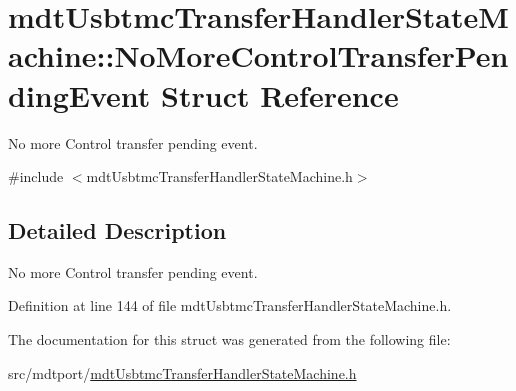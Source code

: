 \hypertarget{structmdt_usbtmc_transfer_handler_state_machine_1_1_no_more_control_transfer_pending_event}{\section{mdt\-Usbtmc\-Transfer\-Handler\-State\-Machine\-:\-:No\-More\-Control\-Transfer\-Pending\-Event Struct Reference}
\label{structmdt_usbtmc_transfer_handler_state_machine_1_1_no_more_control_transfer_pending_event}
}


No more Control transfer pending event.  




{\ttfamily \#include $<$mdt\-Usbtmc\-Transfer\-Handler\-State\-Machine.\-h$>$}



\subsection{Detailed Description}
No more Control transfer pending event. 

Definition at line 144 of file mdt\-Usbtmc\-Transfer\-Handler\-State\-Machine.\-h.



The documentation for this struct was generated from the following file\-:\begin{DoxyCompactItemize}
\item 
src/mdtport/\hyperlink{mdt_usbtmc_transfer_handler_state_machine_8h}{mdt\-Usbtmc\-Transfer\-Handler\-State\-Machine.\-h}\end{DoxyCompactItemize}
